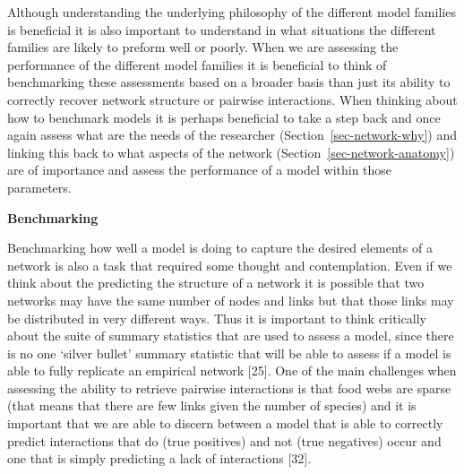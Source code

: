 \documentclass[
]{article}
\begin{document}
\begin{tcolorbox}[enhanced jigsaw, title=\textcolor{quarto-callout-note-color}{\faInfo}\hspace{0.5em}{Box 2 - Assessing model outputs}, arc=.35mm, rightrule=.15mm, coltitle=black, colframe=quarto-callout-note-color-frame, bottomrule=.15mm, opacityback=0, opacitybacktitle=0.6, bottomtitle=1mm, colback=white, colbacktitle=quarto-callout-note-color!10!white, titlerule=0mm, breakable, left=2mm, leftrule=.75mm, toptitle=1mm, toprule=.15mm]

Although understanding the underlying philosophy of the different model
families is beneficial it is also important to understand in what
situations the different families are likely to preform well or poorly.
When we are assessing the performance of the different model families it
is beneficial to think of benchmarking these assessments based on a
broader basis than just its ability to correctly recover network
structure or pairwise interactions. When thinking about how to benchmark
models it is perhaps beneficial to take a step back and once again
assess what are the needs of the researcher
(Section~\ref{sec-network-why}) and linking this back to what aspects of
the network (Section~\ref{sec-network-anatomy}) are of importance and
assess the performance of a model within those parameters.

\textbf{Benchmarking}

Benchmarking how well a model is doing to capture the desired elements
of a network is also a task that required some thought and
contemplation. Even if we think about the predicting the structure of a
network it is possible that two networks may have the same number of
nodes and links but that those links may be distributed in very
different ways. Thus it is important to think critically about the suite
of summary statistics that are used to assess a model, since there is no
one `silver bullet' summary statistic that will be able to assess if a
model is able to fully replicate an empirical network {[}25{]}. One of
the main challenges when assessing the ability to retrieve pairwise
interactions is that food webs are sparse (that means that there are few
links given the number of species) and it is important that we are able
to discern between a model that is able to correctly predict
interactions that do (true positives) and not (true negatives) occur and
one that is simply predicting a lack of interactions {[}32{]}.

\begin{figure}[H]


\end{figure}
\end{tcolorbox}
\end{document}
